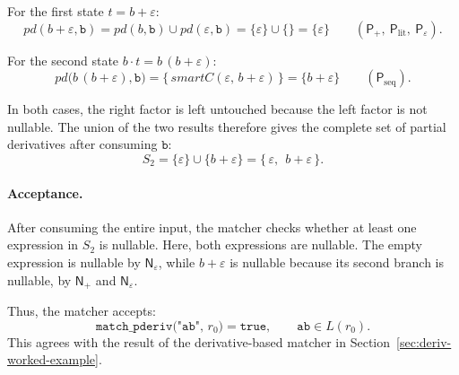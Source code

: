 For the first state $t = b+\varepsilon$:
\[
pd(b+\varepsilon,\mathtt{b})
  = pd(b,\mathtt{b}) \cup pd(\varepsilon,\mathtt{b})
  = \{\varepsilon\} \cup \{\}
  = \{\varepsilon\}
  \qquad (\mathsf{P}_{+},\ \mathsf{P}_{\mathrm{lit}},\
           \mathsf{P}_{\varepsilon}).
\]

For the second state $b\cdot t = b\,(b+\varepsilon)$:
\[
pd\big(b\,(b+\varepsilon),\mathtt{b}\big)
  = \{\, \mathit{smartC}(\varepsilon,\,b+\varepsilon) \,\}
  = \{b+\varepsilon\}
  \qquad (\mathsf{P}_{\mathrm{seq}}).
\]

In both cases, 
the right factor is left untouched 
because the left factor is not nullable. 
The union of the two results 
therefore gives the complete set of
partial derivatives after consuming $\mathtt{b}$:
\[
S_2 = \{\varepsilon\} \cup \{b+\varepsilon\}
    = \{\, \varepsilon,\ \ b+\varepsilon \,\}.
\]

\paragraph{Acceptance.}
After consuming the entire input, the matcher checks whether
at least one expression in $S_2$ is nullable. 
Here, both expressions are nullable. 
The empty expression is nullable by $\mathsf{N}_{\varepsilon}$, 
while $b+\varepsilon$ is nullable 
because its second branch is nullable, 
by $\mathsf{N}_{+}$ and $\mathsf{N}_{\varepsilon}$. 

Thus, the matcher accepts:
\[
\texttt{match\_pderiv("ab", $r_0$)} = \texttt{true},
\qquad
\mathtt{ab} \in L(r_0).
\]
This agrees with the result of the derivative-based matcher
in Section~\ref{sec:deriv-worked-example}.
